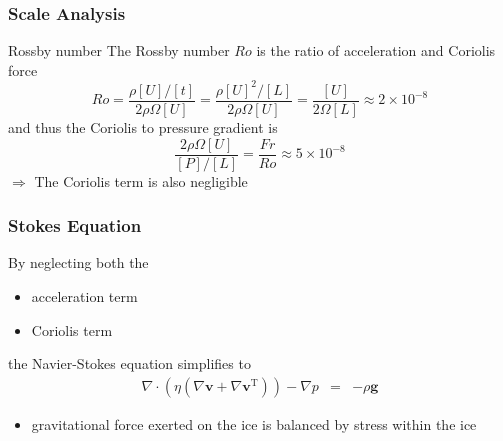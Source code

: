 \documentclass[hide notes,intlimits]{beamer}
\begin{document}
\begin{frame}
  \frametitle{Scale Analysis}
  \begin{block}{Rossby number}
    The \alert{Rossby number $Ro$} is the ratio of acceleration and Coriolis force
  \begin{equation*}
    Ro = \frac{\rho[U]/[t]}{2\rho\Omega[U]} = \frac{\rho[U]^{2}/[L]}{2\rho\Omega[U]} = \frac{[U]}{2 \Omega [L]} \approx 2\times10^{-8}
  \end{equation*}
  and thus the Coriolis to pressure gradient is
  \begin{equation*}
   \frac{2\rho\Omega[U]}{[P]/[L]} = \frac{Fr}{Ro}\approx 5 \times 10^{-8}
  \end{equation*}
  $\Rightarrow$ The \alert{Coriolis term} is also \alert{negligible}
  \end{block}
\end{frame}


\begin{frame}
  \frametitle{Stokes Equation}
  By neglecting both the
  \begin{itemize}
  \item acceleration term
  \item Coriolis term
  \end{itemize}
  the Navier-Stokes equation simplifies to
  \begin{eqnarray}
     \nabla \cdot \left(\eta\left(\nabla \mathbf{v} + \nabla \mathbf{v}^{\text{T}}\right)\right) - \nabla p & = & - \rho \mathbf{g}
  \end{eqnarray}
  \begin{itemize}
  \item gravitational force exerted on the ice is balanced by stress within the ice
  \end{itemize}
\end{frame}
\end{document}
